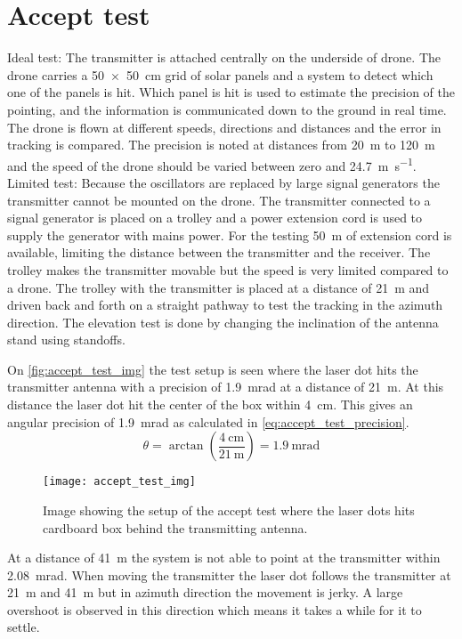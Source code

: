 \section{Accept test}
Ideal test: 
The transmitter is attached centrally on the underside of drone. The drone carries a \SI{50x50}{\centi\meter} grid of solar panels and a system to detect which one of the panels is hit. Which panel is hit is used to estimate the precision of the pointing, and the information is communicated down to the ground in real time. The drone is flown at different speeds, directions and distances and the error in tracking is compared.
The precision is noted at distances from \SI{20}{\meter} to \SI{120}{\meter} and the speed of the drone should be varied between zero and \SI{24.7}{\meter\per\second}. \\
Limited test:
Because the oscillators are replaced by large signal generators the transmitter cannot be mounted on the drone. 
The transmitter connected to a signal generator is placed on a trolley and a power extension cord is used to supply the generator with mains power. For the testing \SI{50}{\meter} of extension cord is available, limiting the distance between the transmitter and the receiver. The trolley makes the transmitter movable but the speed is very limited compared to a drone. The trolley with the transmitter is placed at a distance of \SI{21}{\meter} and driven back and forth on a straight pathway to test the tracking in the azimuth direction. The elevation test is done by changing the inclination of the antenna stand using standoffs.

On \autoref{fig:accept_test_img} the test setup is seen where the laser dot hits the transmitter antenna with a precision of \SI{1.9}{\milli\radian} at a distance of \SI{21}{\meter}. At this distance the laser dot hit the center of the box within \SI{4}{\centi\meter}.
This gives an angular precision of \SI{1.9}{\milli\radian} as calculated in \autoref{eq:accept_test_precision}.
\begin{equation} \label{eq:accept_test_precision}
\theta = \arctan\left(\frac{\SI{4}{\centi\meter}}{\SI{21}{\meter}}\right) = \SI{1.9}{\milli\radian}
\end{equation}

\begin{figure} [h]
\centering
\texttt{[image: accept\_test\_img]}
\caption{Image showing the setup of the accept test where the laser dots hits cardboard box behind the transmitting antenna.}
\label{fig:accept_test_img}
\end{figure}
At a distance of \SI{41}{\meter} the system is not able to point at the transmitter within \SI{2.08}{\milli\radian}. 
When moving the transmitter the laser dot follows the transmitter at \SI{21}{\meter} and \SI{41}{\meter} but in azimuth direction the movement is jerky. A large overshoot is observed in this direction which means it takes a while for it to settle.
